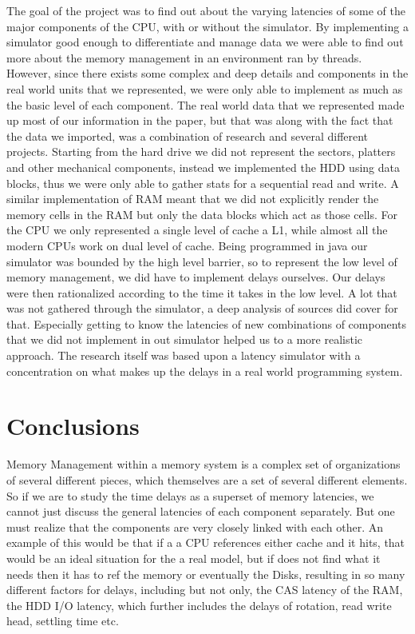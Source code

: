 \documentclass[12pt]{article}
\newcommand{\singlespace}{
  \protect\renewcommand\baselinestretch{1.0}
  \protect\normalsize
}
\begin{document}
The goal of the project was to find out about the varying latencies of some of the major components of the CPU, with
or without the simulator. By implementing a simulator good enough to differentiate and manage data we were able to
find out more about the memory management in an environment ran by threads. However, since there exists some complex
and deep details and components in the real world units that we represented, we were only able to implement as much
as the basic level of each component.
The real world data that we represented made up most of our information in the paper, but that was along with the
fact that the data we imported, was a combination of research and several different projects.
Starting from the hard drive we did not represent the sectors, platters and other mechanical components, instead
we implemented the HDD using data blocks, thus we were only able to gather stats for a sequential read and write.
A similar implementation of RAM meant that we did not explicitly render the memory cells in the RAM but only the
data blocks which act as those cells.
For the CPU we only represented a single level of cache a L1, while almost all the modern CPUs work on dual level
of cache.
Being programmed in java our simulator was bounded by the high level barrier, so to represent the low
level of memory management, we did have to implement delays ourselves. Our delays were then rationalized according
to the time it takes in the low level. 
A lot that was not gathered through the simulator, a deep analysis of sources did cover for that. Especially getting
to know the latencies of new combinations of components that we did not implement in out simulator helped us to a
more realistic approach. The research itself was based upon a latency simulator with a concentration on what makes
up the delays in a real world programming system. 


\section{Conclusions} 

\label{sec:conclusions}

Memory Management within a memory system is a complex set of organizations of several different pieces, which
themselves are a set of several different elements. So if we are to study the time delays as a superset of
memory latencies, we cannot just discuss the general latencies of each component separately. But one must
realize that the components are very closely linked with each other. An example of this would be that if a
a CPU references either  cache and it hits, that would be an ideal situation for the a real model, but if does
not find what it needs then it has to ref the memory or eventually the Disks, resulting in so many different
factors for delays, including but not only, the CAS latency of the RAM, the HDD I/O latency, which further
includes the delays of rotation, read write head, settling time etc.


\singlespace



\end{document}
